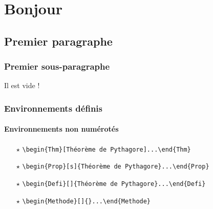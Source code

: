 \documentclass[12pt,french,oneside]{book}
\renewcommand{\headrulewidth}{0cm}
\renewcommand \headrulewidth{0pt}%
\newcommand{\tete}{
\thispagestyle{plain}
\setcounter{chapter}{2}%
\chapter{Bonjour}
\noindent 
\vspace{-12pt}
}
\begin{document}
\setlength\parindent{0mm}
\tete 		%

\renewcommand \footrulewidth{0.2pt}%
\renewcommand \headrulewidth{0pt}%
\pagestyle{fancy}
\fancyhf{}

\begin{spacing}{1.2}
\setcounter{minitocdepth}{3}    %
\minitoc\faketableofcontents

\section{Premier paragraphe}

\subsection{Premier sous-paragraphe}

Il est vide !


\subsection{Environnements définis}

\subsubsection{Environnements non numérotés}

\begin{itemize}
\item[$\star$] \verb=\begin{Thm}[Théorème de Pythagore]...\end{Thm}=\,

\item[$\star$] \verb=\begin{Prop}[s]{Théorème de Pythagore}...\end{Prop}=\,

\item[$\star$] \verb=\begin{Defi}[]{Théorème de Pythagore}...\end{Defi}=\,

\item[$\star$] \verb=\begin{Methode}[]{}...\end{Methode}=\,


\end{itemize}
\end{spacing}
\end{document}
